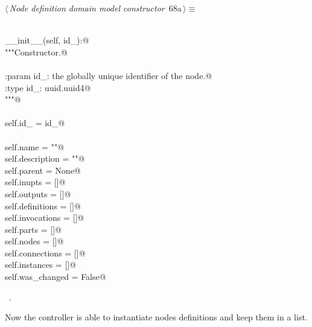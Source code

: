 \documentclass[
    a4paper,      %
    10pt,         %
    openright,    %
    notitlepage,  %
    parskip=half, %
]{scrreprt}       %
\theoremstyle{definition}                    %
\begin{document}
\begin{flushleft} \small
\begin{minipage}{\linewidth}\label{scrap112}\raggedright\small
{} $\langle\,${\itshape Node definition domain model constructor}\nobreak\ {\footnotesize {68a}}$\,\rangle\equiv$
\vspace{-1exm}
\begin{list}{}{} \item
\mbox{}\lstinline@@\\
\mbox{}\lstinline@def __init__(self, id_):@\\
\mbox{}\lstinline@    """Constructor.@\\
\mbox{}\lstinline@@\\
\mbox{}\lstinline@    :param id_: the globally unique identifier of the node.@\\
\mbox{}\lstinline@    :type  id_: uuid.uuid4@\\
\mbox{}\lstinline@    """@\\
\mbox{}\lstinline@@\\
\mbox{}\lstinline@    self.id_         = id_@\\
\mbox{}\lstinline@@\\
\mbox{}\lstinline@    self.name        = ""@\\
\mbox{}\lstinline@    self.description = ""@\\
\mbox{}\lstinline@    self.parent      = None@\\
\mbox{}\lstinline@    self.inupts      = []@\\
\mbox{}\lstinline@    self.outputs     = []@\\
\mbox{}\lstinline@    self.definitions = []@\\
\mbox{}\lstinline@    self.invocations = []@\\
\mbox{}\lstinline@    self.parts       = []@\\
\mbox{}\lstinline@    self.nodes       = []@\\
\mbox{}\lstinline@    self.connections = []@\\
\mbox{}\lstinline@    self.instances   = []@\\
\mbox{}\lstinline@    self.was_changed = False@{\NWsep}
\end{list}
\vspace{-1.5ex}
\footnotesize
\begin{list}{}{\setlength{\itemsep}{-\parsep}\setlength{\itemindent}{-\leftmargin}}
\item \NWtxtMacroRefIn\ .

\item{}
\end{list}
\end{minipage}\vspace{4ex}
\end{flushleft}
Now the controller is able to instantiate nodes definitions and keep them in a
list.
\end{document}
